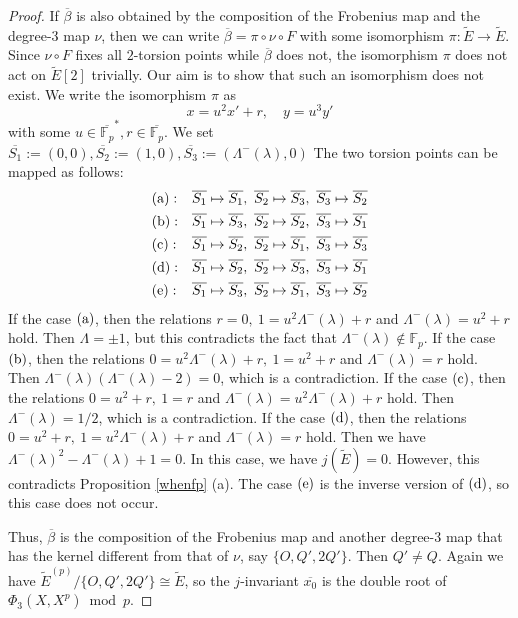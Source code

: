 \documentclass[a4paper, 11pt]{article}
\theoremstyle{plain}
\newcommand{\?}{\textcolor{red}{??}}
\newcommand{\lm}{\lambda}
\newcommand{\Lm}{\Lambda}
\newcommand{\fp}{\mathbb{F}_p}
\begin{document}
\begin{proof}
    If $\overline{\beta}$ is also obtained by the composition of the Frobenius map and the degree-$3$ map $\nu$, then we can write $\overline{\beta}=\pi\circ \nu \circ F$ with some isomorphism $\pi:\tilde{E}\rightarrow\tilde{E}$. Since $\nu \circ F$ fixes all $2$-torsion points while $\overline{\beta}$ does not, the isomorphism $\pi$ does not act on $\tilde{E}[2]$ trivially. Our aim is to show that such an isomorphism does not exist. We write the isomorphism $\pi$ as 
    \[
    x=u^2x'+r, \quad y=u^3y'
    \]
    with some $u\in {\overline{\fp}}^{*} ,r\in {\overline{\fp}}$. We set $\overline{S_1}:=(0,0),\overline{S_2}:=(1,0),\overline{S_3}:=(\Lm^{-}(\lm),0) $ 
    The two torsion points can be mapped as follows:
    \begin{eqnarray*}
&\rm{(a)}:& \overline{S_1} \mapsto \overline{S_1},\ \overline{S_2} \mapsto \overline{S_3},\ \overline{S_3} \mapsto \overline{S_2}\\
&\rm{(b)}:& \overline{S_1} \mapsto \overline{S_3},\ \overline{S_2} \mapsto \overline{S_2},\ \overline{S_3} \mapsto \overline{S_1}\\
 &\rm{(c)}:& \overline{S_1} \mapsto \overline{S_2},\ \overline{S_2} \mapsto \overline{S_1},\ \overline{S_3} \mapsto \overline{S_3}\\
 &\rm{(d)}:&\overline{S_1} \mapsto \overline{S_2},\ \overline{S_2} \mapsto \overline{S_3},\ \overline{S_3} \mapsto \overline{S_1}\\ 
 &\rm{(e)}:& \overline{S_1} \mapsto \overline{S_3},\ \overline{S_2} \mapsto \overline{S_1},\ \overline{S_3} \mapsto \overline{S_2}
    \end{eqnarray*}
    If the case $\rm{(a)}$, then the relations $r=0,\ 1=u^2\Lm^{-}(\lm)+r$ and $\Lm^{-}(\lm)=u^2+r$ hold. Then $\Lm=\pm1$, but this contradicts the fact that $\Lm^{-}(\lm) \notin\fp$.
    If the case $\rm{(b)}$, then the relations $0=u^2\Lm^{-}(\lm)+r,\ 1=u^2+r$ and $\Lm^{-}(\lm)=r$ hold. Then $\Lm^{-}(\lm)(\Lm^{-}(\lm)-2)=0$, which is a contradiction. If the case $\rm{(c)}$, then the relations $0=u^2+r,\ 1=r$ and $\Lm^{-}(\lm)=u^2\Lm^{-}(\lm)+r$ hold. Then $\Lm^{-}(\lm)=1/2$, which is a  contradiction. If the case $\rm{(d)}$, then the relations $0=u^2+r,\ 1=u^2\Lm^{-}(\lm)+r$ and $\Lm^{-}(\lm)=r$ hold. Then we have $\Lm^{-}(\lm)^2-\Lm^{-}(\lm)+1=0$.
    In this case, we have $j(\tilde{E})=0$.  However, this contradicts Proposition \ref{whenfp} (a). The case $\rm{(e)}$ is the inverse version of $\rm{(d)}$, so this case does not occur. 

    Thus, $\overline{\beta}$ is the composition of the Frobenius map and another degree-$3$ map that has the kernel different from that of $\nu$, say $\{O,Q',2Q'\}$.  Then $Q'\ne Q$. Again we have $\tilde{E}^{(p)}/\{O,Q',2Q'\}\cong \tilde{E}$, so the $j$-invariant $\overline{x_0}$ is the double root of $\Phi_3(X,X^p) \bmod p$.
\end{proof}
\end{document}
